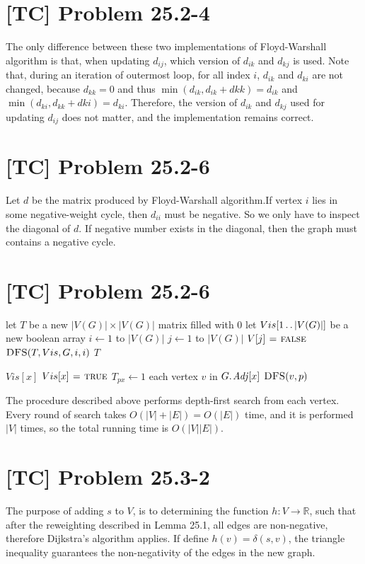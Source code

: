 \documentclass[a4paper,11pt,twocolumn]{article}
\newcommand{\FALSE}{\const{false}}
\newcommand{\TRUE}{\const{true}}
\begin{document}
  \section{[TC] Problem 25.2-4}
  The only difference between these two implementations of Floyd-Warshall algorithm is that, when updating $d_{ij}$, which version of $d_{ik}$ and $d_{kj}$ is used. Note that, during an iteration of outermost loop, for all index $i$, $d_{ik}$ and $d_{ki}$ are not changed, because $d_{kk} = 0$ and thus $\min(d_{ik}, d_{ik} + d{kk}) = d_{ik}$ and $\min(d_{ki}, d_{kk} + d{ki}) = d_{ki}$. Therefore, the version of $d_{ik}$ and $d_{kj}$ used for updating $d_{ij}$ does not matter, and the implementation remains correct.

  \section{[TC] Problem 25.2-6}
  Let $d$ be the matrix produced by Floyd-Warshall algorithm.If vertex $i$ lies in some negative-weight cycle, then $d_{ii}$ must be negative. So we only have to inspect the diagonal of $d$. If negative number exists in the diagonal, then the graph must contains a negative cycle.
  
  \section{[TC] Problem 25.2-6}
   \begin{codebox}
    \li let $T$ be a new $|V(G)| \times |V(G)|$ matrix filled with 0
    \li let $Vis[1 \mathinner{\ldotp\ldotp} |V(G)|]$ be a new boolean array
    \li \For $i \gets 1$ to $|V(G)|$
    \li \Do  \For $j \gets 1$ to $|V(G)|$
    \li      \Do  $V[j] \gets \FALSE$
             \End
    \li      $\textnormal{\scshape DFS}(T, Vis, G, i, i)$
        \End
    \li \Return $T$
  \end{codebox}
  \begin{codebox}
    \li \If $Vis[x]$
    \li \Do \Return
        \End
    \li $Vis[x] \gets \TRUE$
    \li $T_{px} \gets 1$
    \li \For each vertex $v$ in $\attrib{G}{Adj}[x]$
    \li \Do  $\textnormal{\scshape DFS}(v, p)$
        \End
  \end{codebox}
  The procedure described above performs depth-first search from each vertex. Every round of search takes $O(|V|+|E|) = O(|E|)$ time, and it is performed $|V|$ times, so the total running time is $O(|V||E|)$.

  \section{[TC] Problem 25.3-2}
  The purpose of adding $s$ to $V$, is to determining the  function $h : V \rightarrow \mathbb{R}$, such that after the reweighting described in Lemma 25.1, all edges are non-negative, therefore Dijkstra's algorithm applies. If define $h(v) = \delta(s, v)$, the triangle inequality guarantees the non-negativity of the edges in the new graph.
\end{document}

